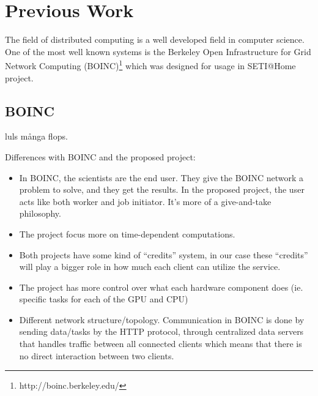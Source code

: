 \chapter{Previous Work}
The field of distributed computing is a well developed field in computer
science. One of the most well known systems is the Berkeley Open Infrastructure
for Grid Network Computing (BOINC)\footnote{http://boinc.berkeley.edu/} which 
was designed for usage in SETI@Home project.



\section{BOINC}
luls många flops.

Differences with BOINC and the proposed project:
\begin{itemize}
	\item In BOINC, the scientists are the end user. They give the BOINC network
		a problem to solve, and they get the results. In the proposed project, 
		the user acts like both worker and job initiator. It’s more of a 
		give-and-take philosophy.
	\item The project focus more on time-dependent computations.
	\item Both projects have some kind of “credits” system, in our case these
		“credits” will play a bigger role in how much each client can utilize
		the service.
	\item The project has more control over what each hardware component does
		(ie. specific tasks for each of the GPU and CPU)
	\item Different network structure/topology. Communication in BOINC is done
		by sending data/tasks by the HTTP protocol, through centralized data
		servers that handles traffic between all connected clients which means 
		that there is no direct interaction between two clients. 
\end{itemize}

